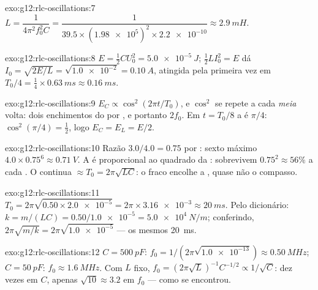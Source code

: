\begin{solution}{exo:g12:rlc-oscillations:7}
$L = \dfrac{1}{4\pi^2 f_0^2 C} = \dfrac{1}{39.5 \times
(\num{1.98e5})^2 \times \num{2.2e-10}} \approx \qty{2.9}{mH}$.
\end{solution}

\begin{solution}{exo:g12:rlc-oscillations:8}
$E = \tfrac12 CU_0^2 = \qty{5.0e-5}{J}$; $\tfrac12 LI_0^2 = E$ dá
$I_0 = \sqrt{2E/L} = \sqrt{\num{1.0e-2}} = \qty{0.10}{A}$, atingida pela
primeira vez em $T_0/4 = \tfrac14 \times \qty{0.63}{ms} \approx
\qty{0.16}{ms}$.
\end{solution}

\begin{solution}{exo:g12:rlc-oscillations:9}
$E_C \propto \cos^2(2\pi t/T_0)$, e $\cos^2$ se repete a cada
\emph{meia} volta: dois enchimentos do  por , e portanto
$2f_0$. Em $t = T_0/8$ a  é $\pi/4$: $\cos^2(\pi/4) = \tfrac12$, logo
$E_C = E_L = E/2$.
\end{solution}

\begin{solution}{exo:g12:rlc-oscillations:10}
Razão $3.0/4.0 = 0.75$ por : sexto máximo
$4.0 \times 0.75^6 \approx \qty{0.71}{V}$. A  é proporcional ao
quadrado da : sobrevivem $0.75^2 \approx 56\%$ a cada . O
 continua $\approx T_0 = 2\pi\sqrt{LC}$: o 
fraco encolhe a , quase não o compasso.
\end{solution}

\begin{solution}{exo:g12:rlc-oscillations:11}
$T_0 = 2\pi\sqrt{0.50 \times \num{2.0e-5}} = 2\pi \times \num{3.16e-3}
\approx \qty{20}{ms}$. Pelo dicionário:
$k = m/(LC) = 0.50/\num{1.0e-5} = \qty{5.0e4}{N/m}$; conferindo,
$2\pi\sqrt{m/k} = 2\pi\sqrt{\num{1.0e-5}}$ --- os mesmos \qty{20}{ms}.
\end{solution}

\begin{solution}{exo:g12:rlc-oscillations:12}
$C = \qty{500}{pF}$: $f_0 = 1/(2\pi\sqrt{\num{1.0e-13}}) \approx
\qty{0.50}{MHz}$; $C = \qty{50}{pF}$: $f_0 \approx \qty{1.6}{MHz}$. Com
$L$ fixo, $f_0 = (2\pi\sqrt{L})^{-1} C^{-1/2} \propto 1/\sqrt{C}$: dez
vezes em $C$, apenas $\sqrt{10} \approx 3.2$ em $f_0$ --- como se
encontrou.
\end{solution}

